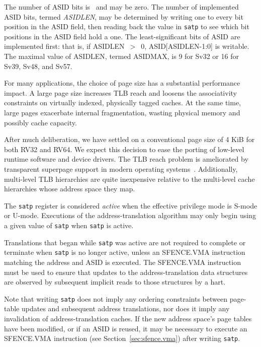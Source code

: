 The number of ASID bits is \unspecified\ and may be zero.  The
number of implemented ASID bits, termed {\mbox {\em ASIDLEN}}, may be
determined by writing one to every bit position in the ASID field, then
reading back the value in {\tt satp} to see which bit positions in the ASID
field hold a one.  The least-significant bits of ASID are implemented first:
that is, if ASIDLEN~$>$~0, ASID[ASIDLEN-1:0] is writable.  The maximal value
of ASIDLEN, termed ASIDMAX, is 9 for Sv32 or 16 for Sv39, Sv48, and Sv57.

\begin{commentary}
For many applications, the choice of page size has a substantial
performance impact.  A large page size increases TLB reach and loosens
the associativity constraints on virtually indexed, physically tagged
caches.  At the same time, large pages exacerbate internal
fragmentation, wasting physical memory and possibly cache capacity.

After much deliberation, we have settled on a conventional page size
of 4 KiB for both RV32 and RV64.  We expect this decision to ease the
porting of low-level runtime software and device drivers.  The TLB
reach problem is ameliorated by transparent superpage support in
modern operating systems~\cite{transparent-superpages}.  Additionally,
multi-level TLB hierarchies are quite inexpensive relative to the
multi-level cache hierarchies whose address space they map.
\end{commentary}

The {\tt satp} register is considered {\em active} when the effective
privilege mode is S-mode or U-mode.
Executions of the
address-translation algorithm may only begin using a given value of {\tt satp}
when {\tt satp} is active.

\begin{commentary}
Translations that began while {\tt satp} was active are not required to
complete or terminate when {\tt satp} is no longer active, unless an
SFENCE.VMA instruction matching the address and ASID is executed.  The
SFENCE.VMA instruction must be used to ensure that updates to the
address-translation data structures are observed by subsequent implicit reads
to those structures by a hart.
\end{commentary}

Note that writing {\tt satp} does not imply any ordering constraints
between page-table updates and subsequent address translations, nor does
it imply any invalidation of address-translation caches.
If the new address space's page tables have been modified, or if an
ASID is reused, it may be necessary to execute an SFENCE.VMA instruction
(see Section~\ref{sec:sfence.vma}) after writing {\tt satp}.

